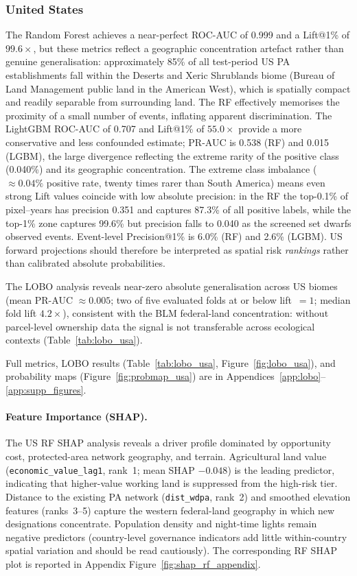 \documentclass[12pt]{article}
\theoremstyle{break}
\begin{document}
\subsubsection{United States}
\label{sec:results_usa}
The Random Forest achieves a near-perfect ROC-AUC of 0.999 and a Lift@1\% of
$99.6\times$, but these metrics reflect a geographic concentration artefact rather
than genuine generalisation: approximately 85\% of all test-period US PA
establishments fall within the Deserts and Xeric Shrublands biome (Bureau of Land
Management public land in the American West), which is spatially compact and readily
separable from surrounding land. The RF effectively memorises the proximity of a
small number of events, inflating apparent discrimination. The LightGBM ROC-AUC of
0.707 and Lift@1\% of $55.0\times$ provide a more conservative and less confounded
estimate; PR-AUC is 0.538 (RF) and 0.015 (LGBM), the large divergence reflecting
the extreme rarity of the positive class (0.040\%) and its geographic concentration.
The extreme class imbalance ($\approx 0.04\%$ positive rate, twenty times rarer than
South America) means even strong Lift values coincide with low absolute precision: in
the RF the top-0.1\% of pixel--years has precision 0.351 and captures 87.3\% of all
positive labels, while the top-1\% zone captures 99.6\% but precision falls to 0.040
as the screened set dwarfs observed events. Event-level Precision@1\% is 6.0\% (RF)
and 2.6\% (LGBM). US forward projections should therefore be interpreted as spatial
risk \emph{rankings} rather than calibrated absolute probabilities.

The LOBO analysis reveals near-zero absolute generalisation across US biomes (mean
PR-AUC $\approx 0.005$; two of five evaluated folds at or below lift~$= 1$; median
fold lift $4.2\times$), consistent with the BLM federal-land concentration: without
parcel-level ownership data the signal is not transferable across ecological contexts
(Table~\ref{tab:lobo_usa}).

Full metrics, LOBO results (Table~\ref{tab:lobo_usa}, Figure~\ref{fig:lobo_usa}),
and probability maps (Figure~\ref{fig:probmap_usa}) are in
Appendices~\ref{app:lobo}--\ref{app:supp_figures}.

\paragraph{Feature Importance (SHAP).}
The US RF SHAP analysis reveals a driver profile dominated by opportunity cost,
protected-area network geography, and terrain. Agricultural land value
(\texttt{economic\_value\_lag1}, rank~1; mean SHAP $-0.048$) is the leading
predictor, indicating that higher-value working land is suppressed from the
high-risk tier. Distance to the existing PA network (\texttt{dist\_wdpa}, rank~2)
and smoothed elevation features (ranks~3--5) capture the western federal-land
geography in which new designations concentrate. Population density and night-time
lights remain negative predictors (country-level governance indicators add little
within-country spatial variation and should be read cautiously).
The corresponding RF SHAP plot is reported in Appendix Figure~\ref{fig:shap_rf_appendix}.
\end{document}
